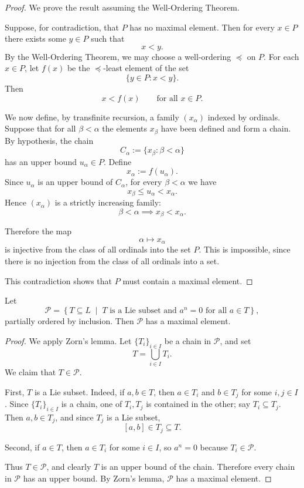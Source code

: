 \documentclass[11pt, a4paper]{report}
\begin{document}
    \begin{proof}
    We prove the result assuming the Well-Ordering Theorem.
    
    Suppose, for contradiction, that $P$ has no maximal element. Then for every $x\in P$ there exists some $y\in P$ such that
    \[
    x<y.
    \]
    By the Well-Ordering Theorem, we may choose a well-ordering $\preceq$ on $P$. For each $x\in P$, let $f(x)$ be the $\preceq$-least element of the set
    \[
    \{y\in P: x<y\}.
    \]
    Then
    \[
    x<f(x)\qquad \text{for all }x\in P.
    \]
    
    We now define, by transfinite recursion, a family $(x_\alpha)$ indexed by ordinals. Suppose that for all $\beta<\alpha$ the elements $x_\beta$ have been defined and form a chain. By hypothesis, the chain
    \[
    C_\alpha:=\{x_\beta:\beta<\alpha\}
    \]
    has an upper bound $u_\alpha\in P$. Define
    \[
    x_\alpha:=f(u_\alpha).
    \]
    Since $u_\alpha$ is an upper bound of $C_\alpha$, for every $\beta<\alpha$ we have
    \[
    x_\beta\leq u_\alpha < x_\alpha.
    \]
    Hence $(x_\alpha)$ is a strictly increasing family:
    \[
    \beta<\alpha \implies x_\beta<x_\alpha.
    \]
    
    Therefore the map
    \[
    \alpha\longmapsto x_\alpha
    \]
    is injective from the class of all ordinals into the set $P$. This is impossible, since there is no injection from the class of all ordinals into a set.
    
    This contradiction shows that $P$ must contain a maximal element.
\end{proof}

\begin{lemma}
    Let
    \[
    \mathcal P
    =
    \left\{
    T\subseteq L \;\middle|\;
    T \text{ is a Lie subset and } a^n=0 \text{ for all } a\in T
    \right\},
    \]
    partially ordered by inclusion. Then $\mathcal P$ has a maximal element.
    \end{lemma}
    
    \begin{proof}
    We apply Zorn's lemma. Let $\{T_i\}_{i\in I}$ be a chain in $\mathcal P$, and set
    \[
    T=\bigcup_{i\in I}T_i.
    \]
    We claim that $T\in\mathcal P$.
    
    First, $T$ is a Lie subset. Indeed, if $a,b\in T$, then $a\in T_i$ and $b\in T_j$ for some $i,j\in I$. Since $\{T_i\}_{i\in I}$ is a chain, one of $T_i,T_j$ is contained in the other; say $T_i\subseteq T_j$. Then $a,b\in T_j$, and since $T_j$ is a Lie subset,
    \[
    [a,b]\in T_j\subseteq T.
    \]
    
    Second, if $a\in T$, then $a\in T_i$ for some $i\in I$, so $a^n=0$ because $T_i\in\mathcal P$.
    
    Thus $T\in\mathcal P$, and clearly $T$ is an upper bound of the chain. Therefore every chain in $\mathcal P$ has an upper bound. By Zorn's lemma, $\mathcal P$ has a maximal element.
\end{proof}
\end{document}
